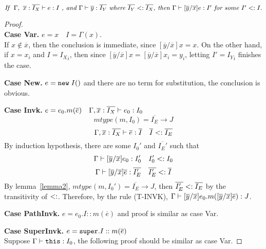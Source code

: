 \begin{lemma}~\label{lemma1}
$\textit{If } \ \judgeewf {\Gamma, \ \overline{x}:\overline{I_X}} { e : I } \textit{ , and }
\judgeewf {\Gamma} {\overline{y}:\overline{I_Y}} \textit{ where } \overline{I_Y} \subtype \overline{I_X}
\textit{, then } \judgeewf {\Gamma} {[\overline{y}/\overline{x}]e : I'} \textit{ for some } I' \subtype I.
$

\begin{proof}~\\
\noindent \textbf{Case Var.}
$ e = x \quad I = \Gamma(x) $. \\
If $x \notin \overline{x}$, then the conclusion is immediate, since $[\overline{y}/\overline{x}]x = x$.
On the other hand, if $x = x_i$ and $I = {I_X}_i$, then since $[\overline{y}/\overline{x}]x = [\overline{y}/\overline{x}]x_i = y_i$,
letting $I' = {I_Y}_i$ finishes the case.

\noindent \textbf{Case New.}
$e = \texttt{new} \; I()$ and there are no term for substitution, the conclusion is obvious.

\noindent \textbf{Case Invk.}
$ e = e_0.m(\overline{e}) \quad
  \Gamma, \overline{x}:\overline{I_X} \; {\vdash} \; e_0 : I_0 $
$$ mtype(m, I_0) = \overline{I_E} \rightarrow J $$
$$ \Gamma, \overline{x}:\overline{I_X} \; {\vdash} \; \overline{e}:\overline{I} \quad
    \overline{I} <: \overline{I_E} $$
By induction hypothesis, there are some $I_0'$ and $\overline{I_E'}$ such that
    $$ \Gamma \; {\vdash} \; [\overline{y}/\overline{x}]e_0 : I_0' \quad 
        I_0' <: I_0 $$
    $$ \Gamma \; {\vdash} \; [\overline{y}/\overline{x}]\overline{e} : \overline{I_E'} \quad  
        \overline{I_E'} <: \overline{I}$$    
By lemma~\ref{lemma2}, 
    $mtype(m, I_0') = \overline{I_E} \rightarrow J$,
then $\overline{I_E'} <: \overline{I_E}$ by the transitivity of $<:$.
Therefore, by the rule (T-INVK), 
    $\Gamma \; {\vdash} \; [\overline{y}/\overline{x}]e_0.m([\overline{y}/\overline{x}]\overline{e}) : J$.

\noindent \textbf{Case PathInvk.}
$ e = e_0.I::m(\overline{e}) $ and proof is similar as case Var.

\noindent \textbf{Case SuperInvk.}
$ e = \texttt{super}.I::m(\overline{e}) $ \\
Suppose $\Gamma \; {\vdash} \; \texttt{this} : I_0$, the following proof should be similar as case Var.
\end{proof}

\end{lemma}

